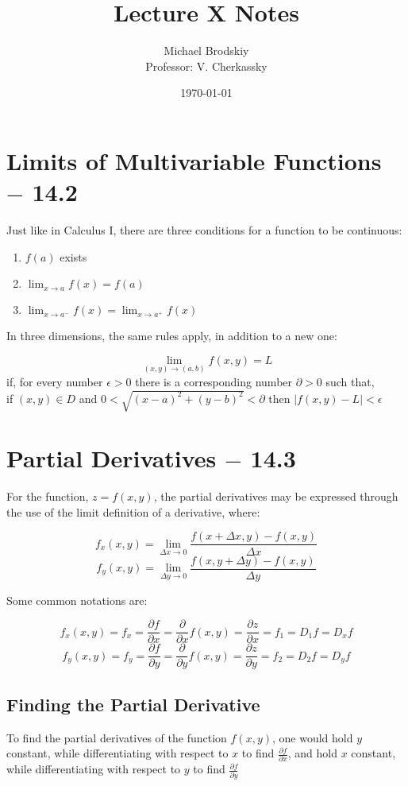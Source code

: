 \documentclass[12pt]{article}
\title{Lecture X Notes}
\date{\today}
\author{Michael Brodskiy\\ \small Professor: V. Cherkassky}
\begin{document}
\maketitle

\section{Limits of Multivariable Functions $-$ 14.2}

Just like in Calculus I, there are three conditions for a function to be continuous:

\begin{enumerate}

  \item $f(a)$ exists

  \item $\lim_{x\to a} f(x) = f(a)$

  \item $\lim_{x\to a^-} f(x) =\lim_{x\to a^+} f(x)$

\end{enumerate}

In three dimensions, the same rules apply, in addition to a new one:

$$\lim_{(x,y)\to(a,b)}f(x,y)=L$$ if, for every number $\epsilon > 0$ there is a corresponding number $\partial > 0$ such that,\\ if $(x,y)\in D$ and $0 < \sqrt{(x-a)^2+(y-b)^2} < \partial$ then $|f(x,y) - L| < \epsilon$

\section{Partial Derivatives $-$ 14.3}

For the function, $z=f(x,y)$, the partial derivatives may be expressed through the use of the limit definition of a derivative, where:

$$f_x(x,y)=\lim_{\Delta x\to0} \frac{f(x+\Delta x,y)-f(x,y)}{\Delta x}$$
$$f_y(x,y)=\lim_{\Delta y\to0} \frac{f(x,y + \Delta y)-f(x,y)}{\Delta y}$$

Some common notations are:

$$f_x(x,y)=f_x=\frac{\partial f}{\partial x}=\frac{\partial}{\partial x}f(x,y)=\frac{\partial z}{\partial x} = f_1=D_1f=D_xf$$
$$f_y(x,y)=f_y=\frac{\partial f}{\partial y}=\frac{\partial}{\partial y}f(x,y)=\frac{\partial z}{\partial y} = f_2=D_2f=D_yf$$

\subsection{Finding the Partial Derivative}

To find the partial derivatives of the function $f(x,y)$, one would hold $y$ constant, while differentiating with respect to $x$ to find $\frac{\partial f}{\partial x}$, and hold $x$ constant, while differentiating with respect to $y$ to find $\frac{\partial f}{\partial y}$
\end{document}
